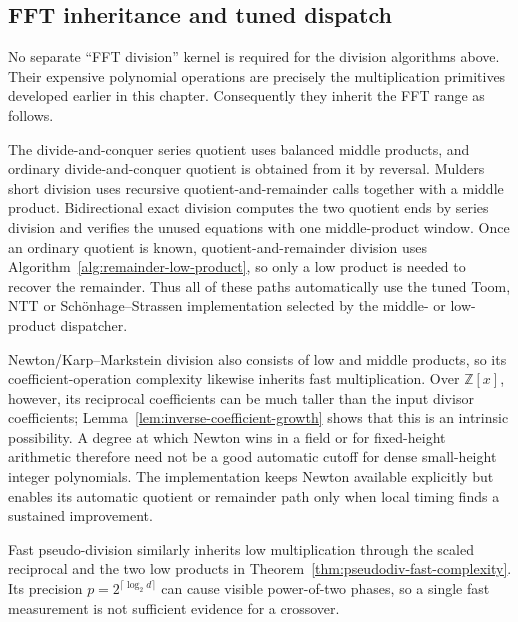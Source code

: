 \documentclass[11pt]{book}
\theoremstyle{definition}
\newcommand{\ZZ}{\mathbb Z}
\begin{document}
\subsection{FFT inheritance and tuned dispatch}

No separate ``FFT division'' kernel is required for the division algorithms
above.  Their expensive polynomial operations are precisely the multiplication
primitives developed earlier in this chapter.  Consequently they inherit the
FFT range as follows.

The divide-and-conquer series quotient uses balanced middle products, and
ordinary divide-and-conquer quotient is obtained from it by reversal.  Mulders
short division uses recursive quotient-and-remainder calls together with a
middle product.  Bidirectional exact division computes the two quotient ends
by series division and verifies the unused equations with one middle-product
window.  Once an ordinary quotient is known, quotient-and-remainder division
uses Algorithm~\ref{alg:remainder-low-product}, so only a low product is needed
to recover the remainder.  Thus all of these paths automatically use the tuned
Toom, NTT or Sch\"onhage--Strassen implementation selected by the middle- or
low-product dispatcher.

Newton/Karp--Markstein division also consists of low and middle products, so
its coefficient-operation complexity likewise inherits fast multiplication.
Over $\ZZ[x]$, however, its reciprocal coefficients can be much taller than
the input divisor coefficients; Lemma~\ref{lem:inverse-coefficient-growth}
shows that this is an intrinsic possibility.  A degree at which Newton wins in
a field or for fixed-height arithmetic therefore need not be a good automatic
cutoff for dense small-height integer polynomials.  The implementation keeps
Newton available explicitly but enables its automatic quotient or remainder
path only when local timing finds a sustained improvement.

Fast pseudo-division similarly inherits low multiplication through the scaled
reciprocal and the two low products in
Theorem~\ref{thm:pseudodiv-fast-complexity}.  Its precision
$p=2^{\lceil\log_2 d\rceil}$ can cause visible power-of-two phases, so a single
fast measurement is not sufficient evidence for a crossover.
\end{document}
